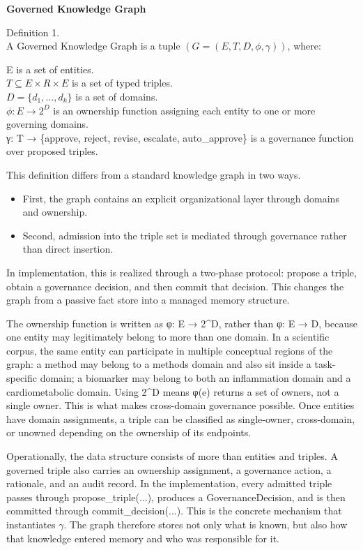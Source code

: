 \textbf{Governed Knowledge Graph}

Definition 1.\\
A Governed Knowledge Graph is a tuple $(G = (E, T, D, \phi, \gamma))$, where:

E is a set of entities.\\
$T \subseteq E \times R \times E$ is a set of typed triples.\\
$D = \{d_1, \ldots, d_k\}$ is a set of domains.\\
$\phi: E \to 2^D$ is an ownership function assigning each entity to one or
more governing domains.\\
γ: T → \{approve, reject, revise, escalate, auto\_approve\} is a
governance function over proposed triples.

This definition differs from a standard knowledge graph in two ways.

\begin{itemize}
\item
  First, the graph contains an explicit organizational layer through
  domains and ownership.
\item
  Second, admission into the triple set is mediated through governance
  rather than direct insertion.
\end{itemize}

In implementation, this is realized through a two-phase protocol:
propose a triple, obtain a governance decision, and then commit that
decision. This changes the graph from a passive fact store into a
managed memory structure.

The ownership function is written as φ: E → 2\^{}D, rather than φ: E →
D, because one entity may legitimately belong to more than one domain.
In a scientific corpus, the same entity can participate in multiple
conceptual regions of the graph: a method may belong to a methods domain
and also sit inside a task-specific domain; a biomarker may belong to
both an inflammation domain and a cardiometabolic domain. Using 2\^{}D
means φ(e) returns a set of owners, not a single owner. This is what
makes cross-domain governance possible. Once entities have domain
assignments, a triple can be classified as single-owner, cross-domain,
or unowned depending on the ownership of its endpoints.

Operationally, the data structure consists of more than entities and
triples. A governed triple also carries an ownership assignment, a
governance action, a rationale, and an audit record. In the
implementation, every admitted triple passes through
propose\_triple(...), produces a GovernanceDecision, and is then
committed through commit\_decision(...). This is the concrete mechanism
that instantiates $\gamma$. The graph therefore stores not only what is known,
but also how that knowledge entered memory and who was responsible for
it.

